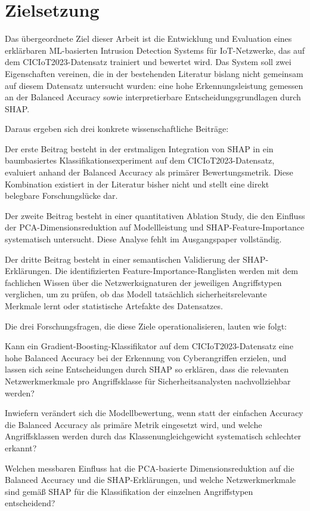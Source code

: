 \section{Zielsetzung}\label{zielsetzung}

Das übergeordnete Ziel dieser Arbeit ist die Entwicklung und Evaluation eines erklärbaren ML-basierten Intrusion Detection Systems für IoT-Netzwerke, das auf dem CICIoT2023-Datensatz trainiert und bewertet wird. Das System soll zwei Eigenschaften vereinen, die in der bestehenden Literatur bislang nicht gemeinsam auf diesem Datensatz untersucht wurden: eine hohe Erkennungsleistung gemessen an der Balanced Accuracy sowie interpretierbare Entscheidungsgrundlagen durch SHAP.

Daraus ergeben sich drei konkrete wissenschaftliche Beiträge:

Der erste Beitrag besteht in der erstmaligen Integration von SHAP in ein baumbasiertes Klassifikationsexperiment auf dem CICIoT2023-Datensatz, evaluiert anhand der Balanced Accuracy als primärer Bewertungsmetrik. Diese Kombination existiert in der Literatur bisher nicht und stellt eine direkt belegbare Forschungslücke dar.

Der zweite Beitrag besteht in einer quantitativen Ablation Study, die den Einfluss der PCA-Dimensionsreduktion auf Modellleistung und SHAP-Feature-Importance systematisch untersucht. Diese Analyse fehlt im Ausgangspaper vollständig.

Der dritte Beitrag besteht in einer semantischen Validierung der SHAP-Erklärungen. Die identifizierten Feature-Importance-Ranglisten werden mit dem fachlichen Wissen über die Netzwerksignaturen der jeweiligen Angriffstypen verglichen, um zu prüfen, ob das Modell tatsächlich sicherheitsrelevante Merkmale lernt oder statistische Artefakte des Datensatzes.

Die drei Forschungsfragen, die diese Ziele operationalisieren, lauten wie folgt:

Kann ein Gradient-Boosting-Klassifikator auf dem CICIoT2023-Datensatz eine hohe Balanced Accuracy bei der Erkennung von Cyberangriffen erzielen, und lassen sich seine Entscheidungen durch SHAP so erklären, dass die relevanten Netzwerkmerkmale pro Angriffsklasse für Sicherheitsanalysten nachvollziehbar werden?

Inwiefern verändert sich die Modellbewertung, wenn statt der einfachen Accuracy die Balanced Accuracy als primäre Metrik eingesetzt wird, und welche Angriffsklassen werden durch das Klassenungleichgewicht systematisch schlechter erkannt?

Welchen messbaren Einfluss hat die PCA-basierte Dimensionsreduktion auf die Balanced Accuracy und die SHAP-Erklärungen, und welche Netzwerkmerkmale sind gemäß SHAP für die Klassifikation der einzelnen Angriffstypen entscheidend?
